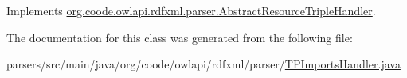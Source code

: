 Implements \hyperlink{classorg_1_1coode_1_1owlapi_1_1rdfxml_1_1parser_1_1_abstract_resource_triple_handler_acfa19ca318d5aaf7fc66e361ba02e7e8}{org.\-coode.\-owlapi.\-rdfxml.\-parser.\-Abstract\-Resource\-Triple\-Handler}.



The documentation for this class was generated from the following file\-:\begin{DoxyCompactItemize}
\item 
parsers/src/main/java/org/coode/owlapi/rdfxml/parser/\hyperlink{_t_p_imports_handler_8java}{T\-P\-Imports\-Handler.\-java}\end{DoxyCompactItemize}
